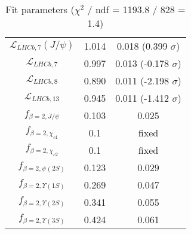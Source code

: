 \begin{table}[h!]
\begin{tabular}{c|c|c}
$\mathcal L_{LHCb,7}(J/\psi)$ & 1.014 & 0.018 (0.399 $\sigma$) \\
$\mathcal L_{LHCb,7}$ & 0.997 & 0.013 (-0.178 $\sigma$) \\
$\mathcal L_{LHCb,8}$ & 0.890 & 0.011 (-2.198 $\sigma$) \\
$\mathcal L_{LHCb,13}$ & 0.945 & 0.011 (-1.412 $\sigma$) \\
$f_{\beta=2,J/\psi}$ & 0.103 & 0.025 \\
$f_{\beta=2,\chi_{c1}}$ & 0.1 & fixed \\
$f_{\beta=2,\chi_{c2}}$ & 0.1 & fixed \\
$f_{\beta=2,\psi(2S)}$ & 0.123 & 0.029 \\
$f_{\beta=2,\Upsilon(1S)}$ & 0.269 & 0.047 \\
$f_{\beta=2,\Upsilon(2S)}$ & 0.341 & 0.055 \\
$f_{\beta=2,\Upsilon(3S)}$ & 0.424 & 0.061 \\
\end{tabular}
\caption{Fit parameters ($\chi^2$ / ndf = 1193.8 / 828 = 1.4)}
\end{table}

